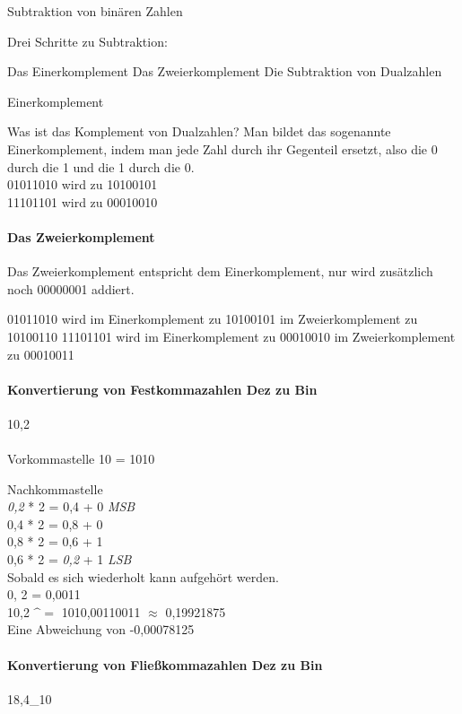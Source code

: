 \documentclass[12pt,twoside,a4paper]{article}
\begin{document}
Subtraktion von binären Zahlen

Drei Schritte zu Subtraktion:

Das Einerkomplement
Das Zweierkomplement
Die Subtraktion von Dualzahlen

Einerkomplement

Was ist das Komplement von Dualzahlen? Man bildet das sogenannte Einerkomplement, indem man jede Zahl durch ihr Gegenteil ersetzt, also die 0 durch die 1 und die 1 durch die 0.\\

01011010 wird zu 10100101\\
11101101 wird zu 00010010\\

\paragraph{Das Zweierkomplement}

Das Zweierkomplement entspricht dem Einerkomplement, nur wird zusätzlich noch 00000001 addiert.

01011010 wird im Einerkomplement zu 10100101 im Zweierkomplement zu 10100110
11101101 wird im Einerkomplement zu 00010010 im Zweierkomplement zu 00010011

\paragraph{Konvertierung von Festkommazahlen Dez zu Bin}

10,2 \\
\\

Vorkommastelle
10 = 1010

Nachkommastelle\\
\emph{0,2} * 2 = 0,4 + 0 \emph{MSB} \\ 
0,4 * 2 = 0,8 + 0\\
0,8 * 2 = 0,6 + 1\\
0,6 * 2 = \emph{0,2} + 1 \emph{LSB} \\ 

Sobald es sich wiederholt kann aufgehört werden.\\
0, 2 = 0,0011\\
10,2 $\^=$ 1010,00110011 $\approx$ 0,19921875
\\
\Longrightarrow Eine Abweichung von  -0,00078125
\\
\paragraph{Konvertierung von Fließkommazahlen Dez zu Bin}
18,4_{10}
\end{document}
